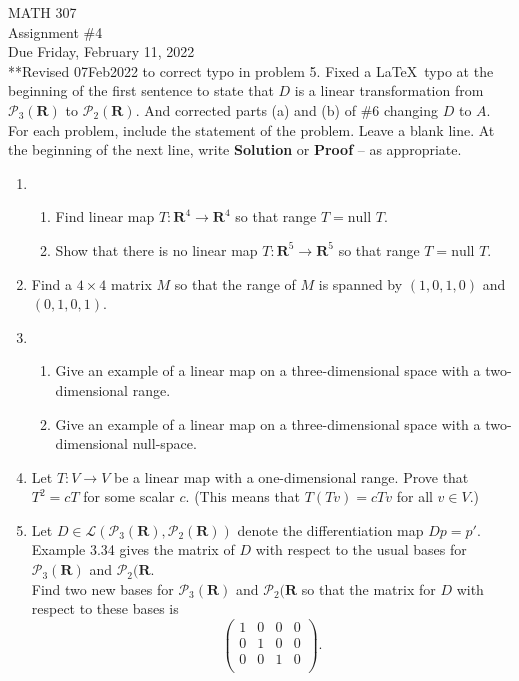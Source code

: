 \documentclass[12pt]{article}
\begin{document}
\noindent MATH 307 \\
Assignment \#4 \\  %
Due Friday, February 11, 2022 \\
**Revised 07Feb2022 to correct typo in problem 5. Fixed a \LaTeX\ typo at the beginning of the first sentence to state that $D$ is a linear transformation from $\mathcal{P}_3(\mathbf{R})$ to $\mathcal{P}_2(\mathbf{R})$. And corrected parts (a) and (b) of \#6 changing $D$ to $A$.\\

For each problem, include the statement of the problem. Leave a blank line.  At the beginning of the next line, write \textbf{Solution} or \textbf{Proof} -- as appropriate.

\begin{enumerate}
\item \begin{enumerate}
    \item Find linear map $T : \mathbf{R}^4 \to \mathbf{R}^4$ so that range $T = \text{null } T$.
    \item Show that there is no linear map $T : \mathbf{R}^5 \to \mathbf{R}^5$ so that range $T = \text{null } T$.
    \end{enumerate}

\item Find a $4 \times 4$ matrix $M$ so that the range of $M$ is spanned by $(1,0,1,0)$ and $(0,1,0,1)$.

\item \begin{enumerate}
        \item Give an example of a linear map on a three-dimensional space with a two-dimensional range.
        \item Give an example of a linear map on a three-dimensional space with a two-dimensional null-space.
    \end{enumerate}

\item Let $T : V \to V$ be a linear map with a one-dimensional range.  Prove that $T^2 = cT$ for some scalar $c$.  (This means that $T(Tv) = cTv$ for all $v \in V$.)

\item Let $D \in \mathcal{L}(\mathcal{P}_3(\mathbf{R}), \mathcal{P}_2(\mathbf{R}))$ denote the differentiation map $Dp = p'$.  Example 3.34 gives the matrix of $D$ with respect to the usual bases for $\mathcal{P}_3(\mathbf{R})$ and $\mathcal{P}_2(\mathbf{R}$.  \\
    Find two new bases for $\mathcal{P}_3(\mathbf{R})$ and $\mathcal{P}_2(\mathbf{R}$ so that the matrix for $D$ with respect to these bases is
    \[
    \left(
      \begin{array}{cccc}
        1 & 0 & 0 & 0 \\
        0 & 1 & 0 & 0 \\
        0 & 0 & 1 & 0 \\
      \end{array}
    \right).
    \]



\end{enumerate}
\end{document}
